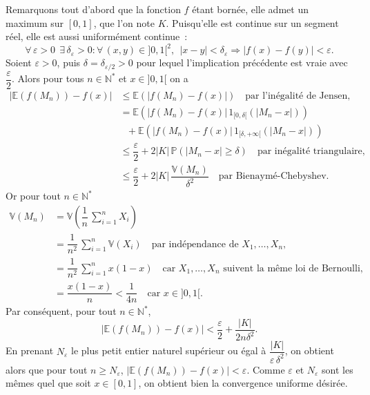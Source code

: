 Remarquons tout d'abord que la fonction \(f\) étant bornée, elle admet
un maximum sur \([0,1]\), que l'on note \(K\). Puisqu'elle est continue
sur un segment réel, elle est aussi uniformément continue~:
\[\forall\,\varepsilon > 0\ \ \exists\,\delta_{\varepsilon} > 0 : \forall\,(x,y) \in ]0,1[^2,\ \ |x-y| < \delta_\varepsilon \Rightarrow \left|f(x) - f(y)\right| < \varepsilon.\]
Soient \(\varepsilon > 0\), puis \(\delta = \delta_{\varepsilon/2} > 0\)
pour lequel l'implication précédente est vraie avec
\(\dfrac{\varepsilon}{2}\). Alors pour tous \(n\in\mathbb{N}^\ast\) et
\(x\in]0,1[\) on a \begin{align*}
\left|\mathbb{E}\left( f(M_n) \right) - f(x)\right| & \leq \mathbb{E}\left( \left|f(M_n) - f(x) \right| \right) \hspace{1em}\text{par l'inégalité de Jensen,}\\
& = \mathbb{E}\left( \left|f(M_n) - f(x) \right|\,1_{[0,\delta[}\left(\left|M_n - x\right|\right) \right)\\
&\ \ \ + \mathbb{E}\left( \left|f(M_n) - f(x) \right|\,1_{[\delta,+\infty[}\left(\left|M_n - x\right|\right) \right)\\
&\leq \dfrac{\varepsilon}{2} + 2|K|\,\mathbb{P}\left(\left|M_n-x\right|\geq \delta\right) \hspace{1em}\text{par inégalité triangulaire,}\\
&\leq \dfrac{\varepsilon}{2} + 2|K|\,\dfrac{\mathbb{V}(M_n)}{\delta^2} \hspace{1em}\text{par Bienaymé-Chebyshev.}
\end{align*} Or pour tout \(n\in\mathbb{N}^\ast\) \begin{align*}
\mathbb{V}(M_n) &= \mathbb{V}\left(\dfrac{1}{n}\,\sum_{i = 1}^n X_i \right)\\
&= \dfrac{1}{n^2}\,\sum_{i = 1}^n \mathbb{V}(X_i) \hspace{1em}\text{par indépendance de $X_1,\dots,X_n$,}\\
&= \dfrac{1}{n^2}\,\sum_{i = 1}^n x(1-x) \hspace{1em}\text{car $X_1,\dots,X_n$ suivent la même loi de Bernoulli},\\
&= \dfrac{x(1-x)}{n} < \dfrac{1}{4n} \hspace{1em}\text{car $x \in ]0,1[$.}
\end{align*} Par conséquent, pour tout \(n\in\mathbb{N}^\ast\),
\[\left|\mathbb{E}\left( f(M_n) \right) - f(x)\right| < \dfrac{\varepsilon}{2} + \dfrac{|K|}{2n\delta^2}.\]
En prenant \(N_\varepsilon\) le plus petit entier naturel supérieur ou
égal à \(\dfrac{|K|}{\varepsilon\,\delta^2}\), on obtient alors que pour
tout \(n\geq N_\varepsilon\),
\(\left|\mathbb{E}\left( f(M_n) \right) - f(x)\right| < \varepsilon.\)
Comme \(\varepsilon\) et \(N_\varepsilon\) sont les mêmes quel que soit
\(x \in [0,1]\), on obtient bien la convergence uniforme désirée.


